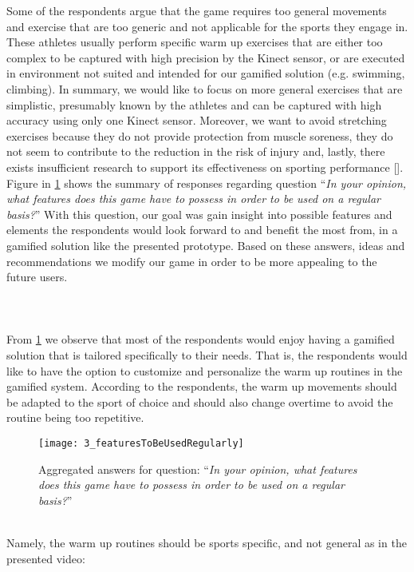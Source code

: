 Some of the respondents argue that the game requires too general movements and exercise that are too generic and not applicable for the sports they engage in. These athletes usually perform specific warm up exercises that are either too complex to be captured with high precision by the Kinect sensor, or are executed in environment not suited and intended for our gamified solution (e.g. swimming, climbing). In summary, we would like to focus on more general exercises that are simplistic, presumably known by the athletes and can be captured with high accuracy using only one Kinect sensor. Moreover, we want to avoid stretching exercises because they do not provide protection from muscle soreness, they do not seem to contribute to the reduction in the risk of injury and, lastly, there exists insufficient research to support its effectiveness on sporting performance [].\\  Figure in \ref{fig:3_featuresToBeUsedRegularly} shows the summary of responses regarding question ``\textit{In your opinion, what features does this game have to possess in order to be used on a regular basis?}'' With this question, our goal was gain insight into possible features and elements the respondents would look forward to and benefit the most from, in a gamified solution like the presented prototype. Based on these answers, ideas and recommendations we modify our game in order to be more appealing to the future users. \\\\\\\\From \ref{fig:3_featuresToBeUsedRegularly} we observe that most of the respondents would enjoy having a gamified solution that is tailored specifically to their needs. That is, the respondents would like to have the option to customize and personalize the warm up routines in the gamified system. According to the respondents, the warm up movements should be adapted to the sport of choice and should also change overtime to avoid the routine being too repetitive.\\
\begin{figure}[h]
    \centering
    \texttt{[image: 3\_featuresToBeUsedRegularly]}
    \caption{Aggregated answers for question: ``\textit{In your opinion, what features does this game have to possess in order to be used on a regular basis?}''}
    \label{fig:3_featuresToBeUsedRegularly}
\end{figure}\\ Namely, the warm up routines should be sports specific, and not general as in the presented video:
